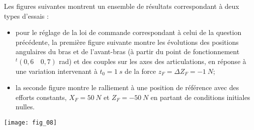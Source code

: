 \begin{multicols}{2}
Les figures suivantes montrent un ensemble de résultats correspondant à deux types d’essais :
\begin{itemize}
\item pour le réglage de la loi de commande correspondant à celui de la question précédente, la première figure suivante montre les évolutions des positions angulaires du bras et de l’avant-bras (à partir du point de fonctionnement $ ^t(0,6 \quad 0,7)$ rad)
et des couples sur les axes des articulations, en réponse à une variation intervenant à $t_0 = \SI{1}{s}$ de la force $z_F = \Delta Z_F = -\SI{1}{N}$;
\item la seconde figure montre le ralliement à une position de référence avec des efforts constants, $X_F = \SI{50}{N}$ et $Z_F = -\SI{50}{N}$ en partant de conditions initiales nulles.
\end{itemize}
\ifprof
\begin{corrige}
\end{corrige}
\else
\fi



\end{multicols}

\begin{center}
\texttt{[image: fig\_08]}
\end{center}
